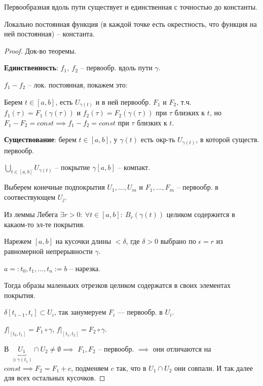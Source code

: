 \begin{theorem}
    Первообразная вдоль пути существует и единственная с точностью до константы.
\end{theorem}
\begin{lemma}
    Локально постоянная функция (в каждой точке есть окрестность, что функция на ней постоянная) -- константа.
\end{lemma}
\begin{proof}
    Док-во теоремы.

    \textbf{Единственность}: $f_1, \ f_2$ -- первообр. вдоль пути $\gamma$.

    $f_1 - f_2$ -- лок. постоянная, покажем это:

    Берем $t \in [a, b]$, есть $U_{\gamma(t)}$ и в ней первообр. $F_1$ и $F_2$, т.ч. $f_1(\tau) = F_1(\gamma(\tau))$ и $f_2(\tau) = F_2(\gamma(\tau))$ при $\tau$ близких к $t$, но $F_1 - F_2 = const \implies f_1 - f_2 = const$ при $\tau$ близких к $t$.


    \textbf{Существование}: берем $t \in [a, b]$, у $\gamma(t)$ есть окр-ть $U_{\gamma(t)}$, в которой существ. первообр.
    

    $\bigcup_{t \in [a, b]} { U_{\gamma(t)} }$ -- покрытие $\gamma [a, b]$ -- компакт.

    Выберем конечные подпокрытия $U_1, \dots, U_m$ и $F_1, \dots, F_m$ -- первообр. в соотвествующем $U_j$.

    Из леммы Лебега $\exists r > 0: \ \forall t \in [a, b]: \ B_r(\gamma(t))$ целиком содержится в какаом-то эл-те покрытия.

    Нарежем $[a, b]$ на кусочки длины $< \delta$, где $\delta > 0$ выбрано по $\epsilon = r$ из равномерной непрерывности $\gamma$.


    $a =: t_0, t_1, \dots, t_n := b$ -- нарезка.

    Тогда образы маленьких отрезков целиком содержатся в своих элементах покрытия.

    $\delta [t_{i-1}, t_i] \subset U_i$, так занумеруем $F_i$ --- первообр. в $U_i$.

    $f|_{[t_0, t_1]} = F_1 \circ \gamma$, $f|_{[t_1, t_2]} = F_2 \circ \gamma$.

    В $\underbrace{U_1}_{\ni \gamma(t_1)} \cap U_2 \not = \emptyset \implies$ $F_1, F_2$ -- первообр. $\implies$ они отличаются на $const \implies F_2 = F_1 + c$, подменяем $c$ так, что в $U_1 \cap U_2$ они совпали. И так далее для всех остальных кусочков.
\end{proof}

